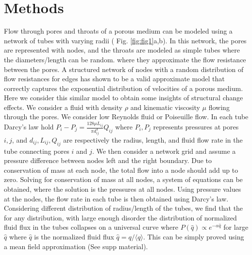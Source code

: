 \documentclass[%
 reprint,
 amsmath,amssymb,
 aps,
]{revtex4-1}
\begin{document}
\section{Methods}
%
Flow through pores and throats of a porous medium can be modeled using a network of tubes with varying radii ( Fig. \ref{fig:fig1}a,b). In this network, the pores are represented with nodes, and the throats are modeled as simple tubes where the diameters/length can be random. where they approximate the flow resistance between the pores. A structured network of nodes with a random distribution of flow resistances for edges has shown to be a valid approximate model that correctly captures the exponential distribution of velocities of a porous medium. Here we consider this similar model to obtain some insights of structural change effects. We consider a fluid with density $\rho$ and kinematic viscosity $\mu$ flowing through the pores. We consider low Reynolds fluid or Poiseuille flow. In each tube Darcy's law hold $ P_i - P_j  = \frac{128 \mu L_{ij} }{\pi d_{ij}^4} Q_{ij}$ where $P_i,P_j$ represents pressures at pores $i,j$, and $d_{ij}, L_{ij}, Q_{ij}$ are respectively the radius, length, and fluid flow rate in the tube connecting pores $i$ and $j$. We then consider a network grid and assume a pressure difference between nodes left and the right boundary. Due to conservation of mass at each node, the total flow into a node should add up to zero. Solving for conservation of mass at all nodes, a system of equations can be obtained, where the solution is the pressures at all nodes. Using pressure values at the nodes, the flow rate in each tube is then obtained using Darcy's law. Considering different distribution of radius/length of the tubes, we find that the for any distribution, with large enough disorder the distribution of normalized fluid flux in the tubes collapses on a universal curve where $P(\hat{q}) \propto e^{-\alpha \hat{q}}$ for large $\hat{q}$ where $\hat{q}$ is the normalized fluid flux $\hat{q} = {q}/\langle q \rangle$. This can be simply proved using a mean field approximation (See supp material). 
\end{document}
